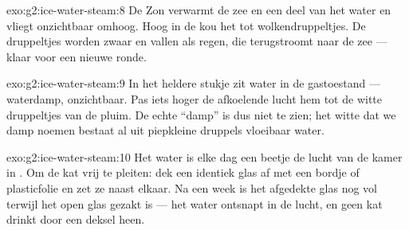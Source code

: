\begin{solution}{exo:g2:ice-water-steam:8}
De Zon verwarmt de zee en een deel van het water  en vliegt
onzichtbaar omhoog. Hoog in de kou  het tot
wolkendruppeltjes. De druppeltjes worden zwaar en vallen als regen,
die terugstroomt naar de zee --- klaar voor een nieuwe ronde.
\end{solution}

\begin{solution}{exo:g2:ice-water-steam:9}
In het heldere stukje zit water in de gastoestand --- waterdamp,
onzichtbaar. Pas iets hoger  de afkoelende lucht hem tot
de witte druppeltjes van de pluim. De echte ``damp'' is dus niet te
zien; het witte dat we damp noemen bestaat al uit piepkleine druppels
vloeibaar water.
\end{solution}

\begin{solution}{exo:g2:ice-water-steam:10}
Het water is elke dag een beetje de lucht van de kamer in .
Om de kat vrij te pleiten: dek een identiek glas af met een bordje of
plasticfolie en zet ze naast elkaar. Na een week is het afgedekte
glas nog vol terwijl het open glas gezakt is --- het water ontsnapt
in de lucht, en geen kat drinkt door een deksel heen.
\end{solution}
